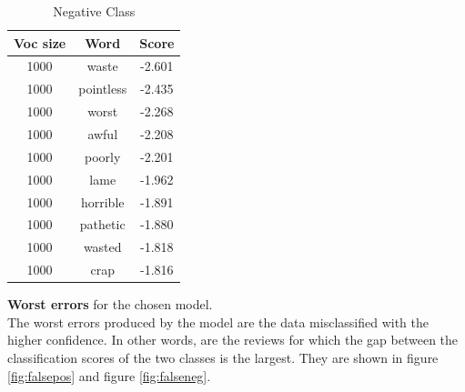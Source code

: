 \documentclass{article}
\begin{document}
\begin{multicols}{2}
    \begin{table}[H]
        \centering
        \caption{\small Negative Class}
        \label{tab:negative_class_impact}
        \begin{tabular}{ |c|c|c| } 
        \hline
        \textbf{Voc size} & \textbf{Word} & \textbf{Score} \\ \hline
        1000 & waste & -2.601 \\ \hline
        1000 & pointless & -2.435 \\ \hline
        1000 & worst & -2.268 \\ \hline
        1000 & awful & -2.208 \\ \hline
        1000 & poorly & -2.201 \\ \hline
        1000 & lame & -1.962 \\ \hline
        1000 & horrible & -1.891 \\ \hline
        1000 & pathetic & -1.880 \\ \hline
        1000 & wasted & -1.818 \\ \hline
        1000 & crap & -1.816 \\ \hline
        \end{tabular}
    \end{table}

\end{multicols}
\vspace{0.3cm}
\break
\noindent
\textbf{Worst errors} for the chosen model.\\
The worst errors produced by the model are the data misclassified with the higher confidence. In other words, are the reviews for which the gap between the
classification scores of the two classes is the largest. They are shown in figure \ref{fig:falsepos} and figure \ref{fig:falseneg}.
\end{document}
